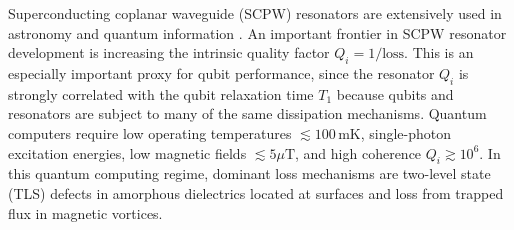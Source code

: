 Superconducting coplanar waveguide (SCPW) resonators are extensively used in astronomy\cite{day2003,mazin2012} and quantum information \cite{mariantoni2011,barends2013,jeffrey2014}.  An important frontier in SCPW resonator development is increasing the intrinsic quality factor $Q_i = 1/\text{loss}$.  This is an especially important proxy for qubit performance, since the resonator $Q_i$ is strongly correlated with the qubit relaxation time $T_1$ because qubits and resonators are subject to many of the same dissipation mechanisms.\cite{wang2015, wisbey2010, song2009a, wang2014, nsanzineza2014, martinis2005, martinis2009, gao2008}  Quantum computers require low operating temperatures $\lesssim 100\,\textrm{mK}$, single-photon excitation energies, low magnetic fields $\lesssim 5\mu\textrm{T}$, and high coherence  $Q_i \gtrsim 10^{6}$.  In this quantum computing regime, dominant loss mechanisms are two-level state (TLS) defects in amorphous dielectrics located at surfaces and loss from trapped flux in magnetic vortices.


